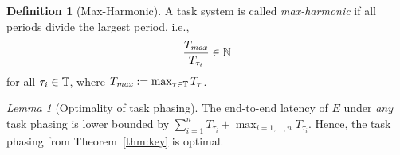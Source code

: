 \documentclass[10pt,conference]{resources/IEEEtran}
\theoremstyle{definition}
\theoremstyle{remark}
\newtheorem{lemma}{Lemma}
\theoremstyle{definition}
\newtheorem{definition}{Definition}
\begin{document}
	\begin{definition}[Max-Harmonic]
		A task system is called \emph{max-harmonic} if all periods divide the largest period, i.e., 
		\begin{equation}
			\frac{T_{\mathit{max}}}{T_{\tau_i}} \in \mathbb{N}
		\end{equation}
		for all $\tau_i \in \mathbb{T}$, where $T_{\mathit{max}} := \max_{\tau\in \mathbb{T}} T_{\tau}$.
	\end{definition}

	\begin{lemma}[Optimality of task phasing]
		The end-to-end latency of $E$ under \emph{any} task phasing is lower bounded by $\sum_{i=1}^{n} T_{\tau_i} + \max_{i=1, \dots, n} T_{\tau_i}$.
		Hence, the task phasing from Theorem~\ref{thm:key} is optimal.
	\end{lemma}
\end{document}
